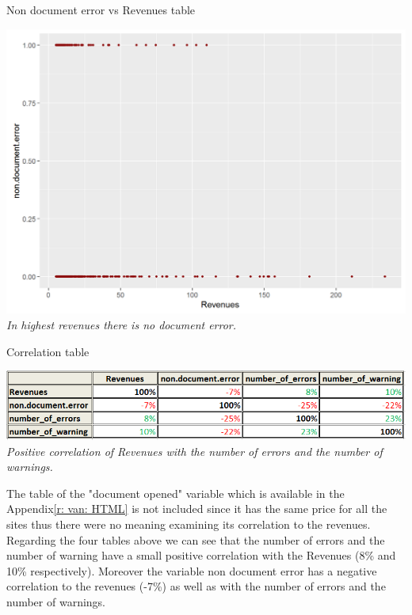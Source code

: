 \documentclass{book}
\begin{document}
\begin{table}[H]
\centering
\caption{Non document error vs Revenues table}
\begin{center}
\includegraphics[scale=0.5]{../R/photos/49_nde_rev.png}    \\
\textit{In highest revenues there is no document error.}
\end{center}
\end{table}
\begin{table}[H]
\centering
\caption{Correlation table}
\begin{center}
\includegraphics[scale=0.5]{../R/photos/51b_HTML_cor.png}    \\
\textit{Positive correlation of Revenues with the number of errors and the number of warnings.}
\end{center}
\end{table}
The table of the "document opened" variable which is available in the Appendix\ref{r: van: HTML} is not included since it has the same price for all the sites thus there were no meaning examining its correlation to the revenues. Regarding the four tables above we can see that the number of errors and the number of warning have a small positive correlation with the Revenues (8\% and 10\% respectively). Moreover the variable non document error has a negative correlation to the revenues (-7\%) as well as with the number of errors and the number of warnings.
\end{document}

